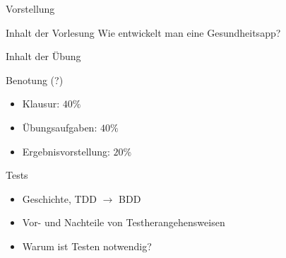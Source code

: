\documentclass[aspectratio=169,t]{beamer}
\begin{document}
\begin{frame}{Vorstellung}
{\begin{textblock}{15}
  \end{textblock}
 }
\end{frame}

\begin{frame}{Inhalt der Vorlesung}
 Wie entwickelt man eine Gesundheitsapp? 
\end{frame}

\begin{frame}{Inhalt der Übung}

\end{frame}

\begin{frame}{Benotung (?)}
 \begin{itemize}
     \item<1-> Klausur: $40\%$
     \item<1-> Übungsaufgaben: $40\%$
     \item<1-> Ergebnisvorstellung: $20\%$
 \end{itemize}
\end{frame}

\begin{frame}{Tests}
 \begin{itemize}
     \item Geschichte, TDD $\rightarrow$ BDD
     \item Vor- und Nachteile von Testherangehensweisen
     \item Warum ist Testen notwendig?
 \end{itemize}
\end{frame}
\end{document}
